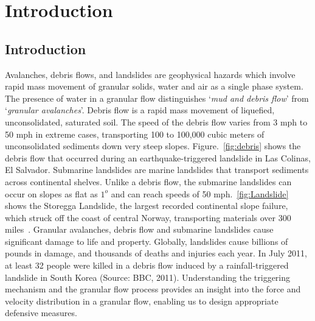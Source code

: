 \chapter{Introduction}

\ifpdf
    \graphicspath{{Chapter1/figs/raster/}{Chapter1/figs/pdf/}{Chapter1/figs/}}
\else
    \graphicspath{{Chapter1/figs/vector/}{Chapter1/figs/}}
\fi

\section{Introduction}
Avalanches, debris flows, and landslides are geophysical hazards which involve 
rapid mass movement of granular solids, water and air as a single phase system. 
The presence of water in a granular flow distinguishes `\textit{mud and debris 
flow}' from `\textit{granular avalanches}'. Debris flow is a rapid mass 
movement of liquefied, unconsolidated, saturated soil. The speed of the debris 
flow varies from 3 mph to 50 mph in extreme cases, transporting 100 to 100,000 
cubic meters of unconsolidated sediments down very steep slopes. 
Figure.~\ref{fig:debris} shows the debris flow that occurred during an 
earthquake-triggered landslide in Las Colinas,  El Salvador. Submarine 
landslides are marine landslides that transport sediments across continental 
shelves. Unlike a debris flow, the submarine landslides can occur on slopes as 
flat as $1^{o}$ and can reach speeds of 50 mph.~\cref{fig:Landslide} 
shows the Storegga Landslide, the largest recorded continental slope failure, 
which struck off the coast of central Norway, transporting materials over 300 
miles~\citep{Ward2002}. Granular avalanches, debris flow and submarine 
landslides cause significant damage to life and property. Globally, landslides 
cause billions of pounds in damage, and thousands of deaths and injuries each 
year. In July 2011, at least 32 people were killed in a debris flow induced by 
a rainfall-triggered landslide in South Korea (Source: BBC, 2011). 
Understanding the triggering mechanism and the granular flow process provides 
an insight into the force and velocity distribution in a granular flow, 
enabling us to design appropriate defensive measures. 

